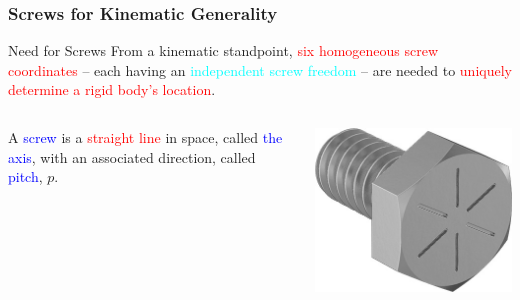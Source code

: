 \begin{frame}
	\frametitle{Screws for Kinematic Generality}
	\begin{block}{Need for Screws}
		From a kinematic standpoint, \textcolor{red}{six homogeneous screw coordinates} -- each having an \textcolor{cyan}{independent screw freedom} -- are needed to \textcolor{red}{uniquely determine a rigid body's location}.
	\end{block}
	\begin{columns}[b]
		\begin{column}{.7\columnwidth}
			\begin{definition}
				A \textcolor{blue}{screw} is a \textcolor{red}{straight line} in space, called \textcolor{blue}{the axis}, with an associated direction, called \textcolor{blue}{pitch}, $p$.
			\end{definition}
		\end{column}
		\begin{column}{.25\columnwidth}
			\centering
			\includegraphics[width=\textwidth]{figures/screw.jpg}
		\end{column}
	\end{columns}
\end{frame}

